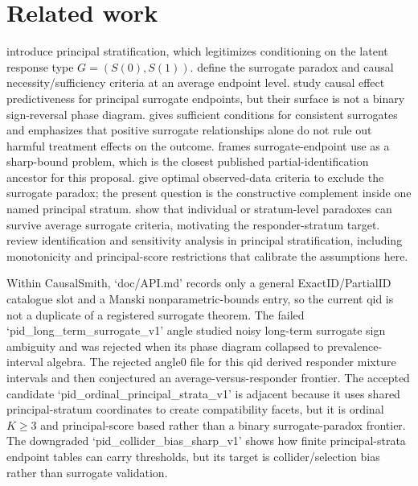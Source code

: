 \documentclass[11pt]{article}
\theoremstyle{definition}
\theoremstyle{plain}
\theoremstyle{remark}
\begin{document}
\section{Related work}
\citet{FrangakisRubin2002} introduce principal stratification, which legitimizes conditioning on the latent response type \(G=(S(0),S(1))\). \citet{ChenGengJia2007} define the surrogate paradox and causal necessity/sufficiency criteria at an average endpoint level. \citet{GilbertHudgens2008} study causal effect predictiveness for principal surrogate endpoints, but their surface is not a binary sign-reversal phase diagram. \citet{VanderWeele2013} gives sufficient conditions for consistent surrogates and emphasizes that positive surrogate relationships alone do not rule out harmful treatment effects on the outcome. \citet{KurokiCai2013} frames surrogate-endpoint use as a sharp-bound problem, which is the closest published partial-identification ancestor for this proposal. \citet{YinLiuGengLuo2019} give optimal observed-data criteria to exclude the surrogate paradox; the present question is the constructive complement inside one named principal stratum. \citet{MaYinLiuGeng2021} show that individual or stratum-level paradoxes can survive average surrogate criteria, motivating the responder-stratum target. \citet{DingLu2017} review identification and sensitivity analysis in principal stratification, including monotonicity and principal-score restrictions that calibrate the assumptions here.

Within CausalSmith, `doc/API.md' records only a general ExactID/PartialID catalogue slot and a Manski nonparametric-bounds entry, so the current qid is not a duplicate of a registered surrogate theorem. The failed `pid_long_term_surrogate_v1' angle studied noisy long-term surrogate sign ambiguity and was rejected when its phase diagram collapsed to prevalence-interval algebra. The rejected angle0 file for this qid derived responder mixture intervals and then conjectured an average-versus-responder frontier. The accepted candidate `pid_ordinal_principal_strata_v1' is adjacent because it uses shared principal-stratum coordinates to create compatibility facets, but it is ordinal \(K\ge3\) and principal-score based rather than a binary surrogate-paradox frontier. The downgraded `pid_collider_bias_sharp_v1' shows how finite principal-strata endpoint tables can carry thresholds, but its target is collider/selection bias rather than surrogate validation.
\end{document}
